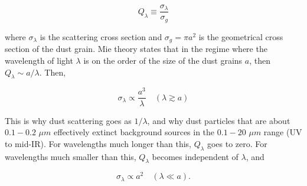 \begin{equation}
Q_\lambda \equiv \frac{\sigma_{\lambda}}{\sigma_g}
\end{equation}

\noindent where $\sigma_\lambda$ is the scattering cross section and $\sigma_g = \pi a^2$ is the geometrical cross section of the dust grain.  Mie theory states that in the regime where the wavelength of light $\lambda$ is on the order of the size of the dust grains $a$, then $Q_\lambda \sim a/\lambda$.  Then,

\begin{equation}
\sigma_\lambda \propto \frac{a^3}{\lambda} \quad (\lambda \gtrsim a)
\end{equation}

This is why dust scattering goes as $1/\lambda$, and why dust particles that are about $0.1-0.2$ $\mu m$ effectively extinct background sources in the $0.1 - 20$ $\mu m$ range (UV to mid-IR).  For wavelengths much longer than this, $Q_{\lambda}$ goes to zero.  For wavelengths much smaller than this, $Q_\lambda$ becomes independent of $\lambda$, and

\begin{equation}
\sigma_\lambda \propto a^2 \quad (\lambda \ll a).
\end{equation}


